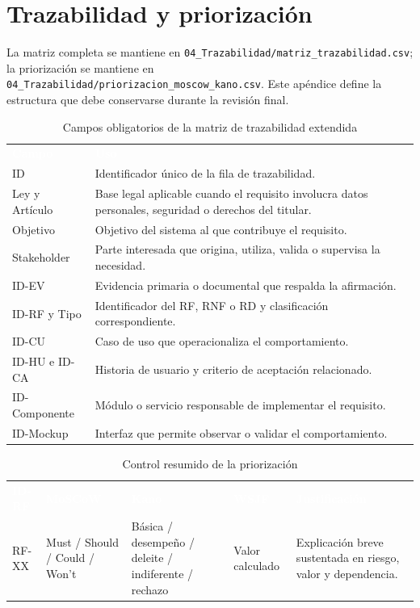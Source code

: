 \documentclass[12pt,a4paper]{article}
\begin{document}
\section{Trazabilidad y priorización}
\label{ap:trazabilidad-priorizacion}

La matriz completa se mantiene en \nolinkurl{04_Trazabilidad/matriz_trazabilidad.csv}; la priorización se mantiene en \nolinkurl{04_Trazabilidad/priorizacion_moscow_kano.csv}. Este apéndice define la estructura que debe conservarse durante la revisión final.

\begin{table}[H]
\centering
\caption{Campos obligatorios de la matriz de trazabilidad extendida}
\label{tab:campos-trazabilidad-anexo}
\small
{}
\begin{tabularx}{\textwidth}{L{3.25cm} Y}
\textcolor{white}{\textbf{Campo}} &
\textcolor{white}{\textbf{Uso}}\\
ID & Identificador único de la fila de trazabilidad.\\
Ley y Artículo & Base legal aplicable cuando el requisito involucra datos personales, seguridad o derechos del titular.\\
Objetivo & Objetivo del sistema al que contribuye el requisito.\\
Stakeholder & Parte interesada que origina, utiliza, valida o supervisa la necesidad.\\
ID-EV & Evidencia primaria o documental que respalda la afirmación.\\
ID-RF y Tipo & Identificador del RF, RNF o RD y clasificación correspondiente.\\
ID-CU & Caso de uso que operacionaliza el comportamiento.\\
ID-HU e ID-CA & Historia de usuario y criterio de aceptación relacionado.\\
ID-Componente & Módulo o servicio responsable de implementar el requisito.\\
ID-Mockup & Interfaz que permite observar o validar el comportamiento.\\
\end{tabularx}
\end{table}

\begin{table}[H]
\centering
\caption{Control resumido de la priorización}
\label{tab:control-priorizacion-anexo}
\small
{}
\begin{tabularx}{\textwidth}{L{2.35cm} L{2.35cm} L{2.35cm} L{2.35cm} Y}
\textcolor{white}{\textbf{ID-RF}} &
\textcolor{white}{\textbf{MoSCoW}} &
\textcolor{white}{\textbf{Kano}} &
\textcolor{white}{\textbf{WSJF}} &
\textcolor{white}{\textbf{Justificación}}\\
RF-XX & Must / Should / Could / Won't & Básica / desempeño / deleite / indiferente / rechazo & Valor calculado & Explicación breve sustentada en riesgo, valor y dependencia.\\
\end{tabularx}
\end{table}
\end{document}
